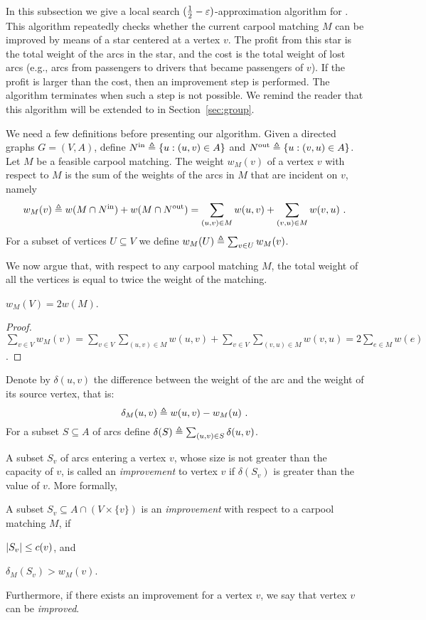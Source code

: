 
In this subsection we give a local search $(\half-\eps)$-approximation
algorithm for \carpool.  This algorithm repeatedly checks whether the
current carpool matching $M$ can be improved by means of a star
centered at a vertex $v$.  The profit from this star is the total
weight of the arcs in the star, and the cost is the total weight of
lost arcs (e.g., arcs from passengers to drivers that became
passengers of $v$).  If the profit is larger than the cost, then an
improvement step is performed.  The algorithm terminates when such a
step is not possible.
%
We remind the reader that this algorithm will be extended to \gcp in
Section~\ref{sec:group}.

We need a few definitions before presenting our algorithm.
%
Given a directed graphs $G = (V,A)$, define $\nin[] \eqdf \set{u :
(u,v) \in A}$ and $\nout[] \eqdf \set{u : (v,u) \in A}$.
%
Let $M$ be a feasible carpool matching.  The weight $w_M(v)$ of a
vertex $v$ with respect to $M$ is the sum of the weights of the arcs
in $M$ that are incident on $v$, namely
\[
w_M(v)
\eqdf w(M \cap \nin[]) + w(M \cap \nout[])
=     \sum_{(u, v) \in M} w(u, v) + \sum_{(v, u) \in M} w(v, u)
~.
\]
For a subset of vertices $U \subseteq V$ we define
$w_M(U) \eqdf \sum_{v \in U} w_M(v)$.

We now argue that, with respect to any carpool matching $M$, the total
weight of all the vertices is equal to twice the weight of the matching.

\begin{observation}
\label{lm:val-twice}
$w_M(V) = 2 w(M)$.
\end{observation}
\begin{proof}
\(
\displaystyle
\sum_{v \in V} w_M(v)
= \sum_{v \in V} \sum_{(u, v) \in M} w(u, v) +
    \sum_{v \in V} \sum_{(v, u) \in M} w(v, u) 
= 2 \sum_{e \in M} w(e)
\).
\end{proof}

Denote by $\delta(u,v)$ the difference between the weight of the arc
and the weight of its source vertex, that is:
\[
\delta_M(u, v) \eqdf w(u, v) - w_M(u)
~.
\]
For a subset $S \subseteq A$ of arcs define
$\delta(S) \eqdf \sum_{(u,v) \in S} \delta(u,v)$.

A subset $S_v$ of arcs entering a vertex $v$, whose size is not
greater than the capacity of $v$, is called an \emph{improvement} to
vertex $v$ if $\delta(S_v)$ is greater than the value of $v$.  More
formally, 

\begin{definition}
A subset $S_v \subseteq A \cap (V \times \{v\})$ is
an \emph{improvement} with respect to a carpool matching $M$, if%
\begin{inparaenum}[(i)]
\item $\abs{S_v} \leq c(v)$, and
\item $\delta_M(S_v) > w_M(v)$.
\end{inparaenum}
Furthermore, if there exists an improvement for a vertex $v$, we say
that vertex $v$ can be \emph{improved}.
\end{definition}

